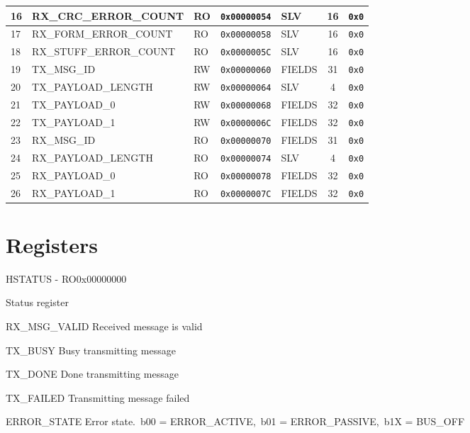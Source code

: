 \documentclass{article}
\begin{document}
\begin{table}[h!]
\begin{center}
\begin{tabularx}{\linewidth}{|l|X|l|l|l|c|l|}
      \hline
      16 & RX{\_}CRC{\_}ERROR{\_}COUNT & RO & \texttt{0x00000054} & SLV & 16 & \texttt{0x0} \\
      \hline
      17 & RX{\_}FORM{\_}ERROR{\_}COUNT & RO & \texttt{0x00000058} & SLV & 16 & \texttt{0x0} \\
      \hline
      18 & RX{\_}STUFF{\_}ERROR{\_}COUNT & RO & \texttt{0x0000005C} & SLV & 16 & \texttt{0x0} \\
      \hline
      19 & TX{\_}MSG{\_}ID & RW & \texttt{0x00000060} & FIELDS & 31 & \texttt{0x0} \\
      \hline
      20 & TX{\_}PAYLOAD{\_}LENGTH & RW & \texttt{0x00000064} & SLV & 4 & \texttt{0x0} \\
      \hline
      21 & TX{\_}PAYLOAD{\_}0 & RW & \texttt{0x00000068} & FIELDS & 32 & \texttt{0x0} \\
      \hline
      22 & TX{\_}PAYLOAD{\_}1 & RW & \texttt{0x0000006C} & FIELDS & 32 & \texttt{0x0} \\
      \hline
      23 & RX{\_}MSG{\_}ID & RO & \texttt{0x00000070} & FIELDS & 31 & \texttt{0x0} \\
      \hline
      24 & RX{\_}PAYLOAD{\_}LENGTH & RO & \texttt{0x00000074} & SLV & 4 & \texttt{0x0} \\
      \hline
      25 & RX{\_}PAYLOAD{\_}0 & RO & \texttt{0x00000078} & FIELDS & 32 & \texttt{0x0} \\
      \hline
      26 & RX{\_}PAYLOAD{\_}1 & RO & \texttt{0x0000007C} & FIELDS & 32 & \texttt{0x0} \\
      \hline
    \end{tabularx}
  \end{center}
\end{table}

\section{Registers}

\begin{register}{H}{STATUS - RO}{0x00000000}  \par Status register \regnewline
  \label{STATUS}
\regnewline
  \begin{regdesc}\begin{reglist}
    \item [RX{\_}MSG{\_}VALID] Received message is valid    \item [TX{\_}BUSY] Busy transmitting message    \item [TX{\_}DONE] Done transmitting message    \item [TX{\_}FAILED] Transmitting message failed    \item [ERROR{\_}STATE] Error state.\ b00 = ERROR{\_}ACTIVE,\ b01 = ERROR{\_}PASSIVE,\ b1X = BUS{\_}OFF  \end{reglist}\end{regdesc}
\end{register}
\end{document}
